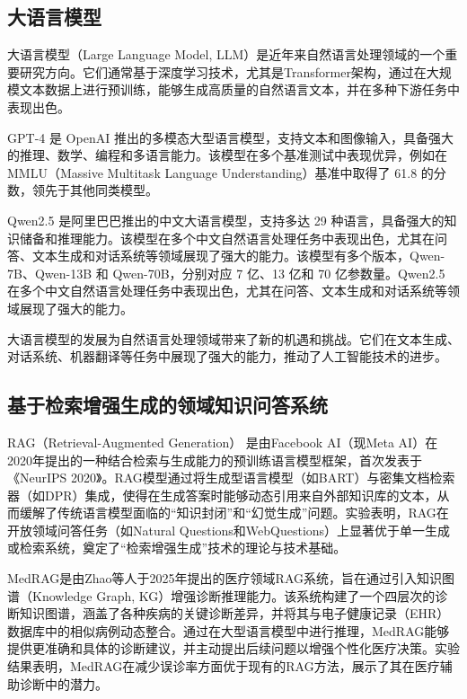 \documentclass[12pt, a4paper]{ctexart}
\begin{document}
\subsection{大语言模型}
大语言模型（Large Language Model, LLM）是近年来自然语言处理领域的一个重要研究方向。它们通常基于深度学习技术，尤其是Transformer架构，通过在大规模文本数据上进行预训练，能够生成高质量的自然语言文本，并在多种下游任务中表现出色。

GPT-4 是 OpenAI 推出的多模态大型语言模型，支持文本和图像输入，具备强大的推理、数学、编程和多语言能力\cite{openai2024gpt4technicalreport}。该模型在多个基准测试中表现优异，例如在 MMLU（Massive Multitask Language Understanding）基准中取得了 61.8 的分数，领先于其他同类模型。

Qwen2.5 是阿里巴巴推出的中文大语言模型，支持多达 29 种语言，具备强大的知识储备和推理能力\cite{qwen2025qwen25technicalreport}。该模型在多个中文自然语言处理任务中表现出色，尤其在问答、文本生成和对话系统等领域展现了强大的能力。该模型有多个版本，Qwen-7B、Qwen-13B 和 Qwen-70B，分别对应 7 亿、13 亿和 70 亿参数量。Qwen2.5 在多个中文自然语言处理任务中表现出色，尤其在问答、文本生成和对话系统等领域展现了强大的能力。

大语言模型的发展为自然语言处理领域带来了新的机遇和挑战。它们在文本生成、对话系统、机器翻译等任务中展现了强大的能力，推动了人工智能技术的进步。

\subsection{基于检索增强生成的领域知识问答系统}
RAG（Retrieval-Augmented Generation） 是由Facebook AI（现Meta AI）在2020年提出的一种结合检索与生成能力的预训练语言模型框架，首次发表于《NeurIPS 2020》。RAG模型通过将生成型语言模型（如BART）与密集文档检索器（如DPR）集成，使得在生成答案时能够动态引用来自外部知识库的文本，从而缓解了传统语言模型面临的“知识封闭”和“幻觉生成”问题。实验表明，RAG在开放领域问答任务（如Natural Questions和WebQuestions）上显著优于单一生成或检索系统，奠定了“检索增强生成”技术的理论与技术基础。

MedRAG是由Zhao等人于2025年提出的医疗领域RAG系统，旨在通过引入知识图谱（Knowledge Graph, KG）增强诊断推理能力\cite{zhao2025medragenhancingretrievalaugmentedgeneration}。该系统构建了一个四层次的诊断知识图谱，涵盖了各种疾病的关键诊断差异，并将其与电子健康记录（EHR）数据库中的相似病例动态整合。通过在大型语言模型中进行推理，MedRAG能够提供更准确和具体的诊断建议，并主动提出后续问题以增强个性化医疗决策。实验结果表明，MedRAG在减少误诊率方面优于现有的RAG方法，展示了其在医疗辅助诊断中的潜力。
\end{document}
